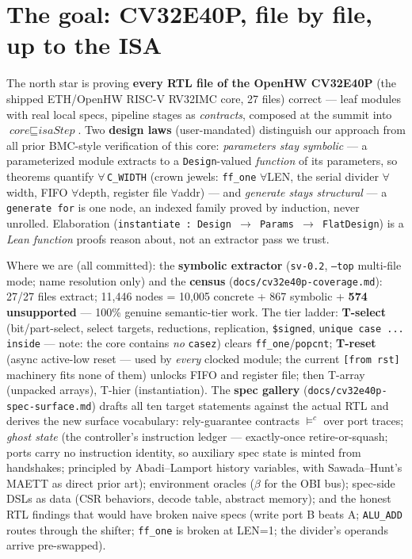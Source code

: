 \documentclass[10pt]{article}
\newcommand{\code}[1]{\texttt{#1}}
\begin{document}
\section{The goal: CV32E40P, file by file, up to the ISA}
The north star is proving \textbf{every RTL file of the OpenHW CV32E40P} (the shipped
ETH/OpenHW RISC-V RV32IMC core, 27 files) correct --- leaf modules with real local specs,
pipeline stages as \emph{contracts}, composed at the summit into
$\textit{core} \sqsubseteq \textit{isaStep}$. Two \textbf{design laws} (user-mandated)
distinguish our approach from all prior BMC-style verification of this core:
\emph{parameters stay symbolic} --- a parameterized module extracts to a
\code{Design}-valued \emph{function} of its parameters, so theorems quantify
$\forall\,$\code{C\_WIDTH} (crown jewels: \code{ff\_one} $\forall$LEN, the serial divider
$\forall$width, FIFO $\forall$depth, register file $\forall$addr) --- and \emph{generate
stays structural} --- a \code{generate for} is one node, an indexed family proved by
induction, never unrolled. Elaboration (\code{instantiate : Design $\to$ Params $\to$ FlatDesign})
is a \emph{Lean function} proofs reason about, not an extractor pass we trust.

Where we are (all committed): the \textbf{symbolic extractor} (\code{sv-0.2},
\code{--top} multi-file mode; name resolution only) and the \textbf{census}
(\code{docs/cv32e40p-coverage.md}): 27/27 files extract; 11{,}446 nodes = 10{,}005
concrete + 867 symbolic + \textbf{574 unsupported} --- 100\% genuine semantic-tier work.
The tier ladder: \textbf{T-select} (bit/part-select, select targets, reductions,
replication, \code{\$signed}, \code{unique case ... inside} --- note: the core contains
\emph{no} \code{casez}) clears \code{ff\_one}/\code{popcnt}; \textbf{T-reset} (async
active-low reset --- used by \emph{every} clocked module; the current \code{[from rst]}
machinery fits none of them) unlocks FIFO and register file; then T-array (unpacked
arrays), T-hier (instantiation). The \textbf{spec gallery}
(\code{docs/cv32e40p-spec-surface.md}) drafts all ten target statements against the actual
RTL and derives the new surface vocabulary: rely-guarantee contracts $\vDash^{c}$ over port
traces; \emph{ghost state} (the controller's instruction ledger --- exactly-once
retire-or-squash; ports carry no instruction identity, so auxiliary spec state is minted
from handshakes; principled by Abadi--Lamport history variables, with Sawada--Hunt's MAETT
as direct prior art); environment oracles ($\beta$ for the OBI bus); spec-side DSLs as
data (CSR behaviors, decode table, abstract memory); and the honest RTL findings that would
have broken naive specs (write port B beats A; \code{ALU\_ADD} routes through the shifter;
\code{ff\_one} is broken at LEN=1; the divider's operands arrive pre-swapped).
\end{document}
